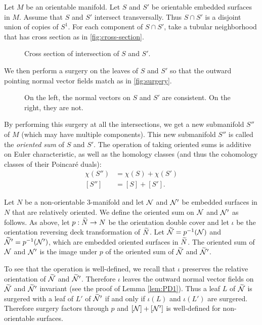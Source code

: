 Let $M$ be an orientable manifold.
Let $S$ and $S'$ be orientable embedded surfaces in $M$.
Assume that $S$ and $S'$ intersect transversally.
Thus $S \cap S'$ is a disjoint union of copies of $S^1$.
For each component of $S\cap S'$, take a tubular neighborhood that has cross section as in \autoref{fig:cross-section}.
\begin{figure}
  \centering
  \caption{Cross section of intersection of $S$ and $S'$.}
  \label{fig:cross-section}
\end{figure}



We then perform a surgery on the leaves of $S$ and $S'$ so that the outward pointing normal vector fields match as in \autoref{fig:surgery}.
\begin{figure}[b]
  \centering
  \caption{On the left, the normal vectors on $S$ and $S'$ are consistent. On the right, they are not.}
  \label{fig:surgery}
\end{figure}

By performing this surgery at all the intersections, we get a new submanifold $S''$ of $M$ (which may have multiple components).
This new submanifold $S''$ is called the {\it oriented sum} of $S$ and $S'$.
The operation of taking oriented sums is additive on Euler characteristic, as well as the homology classes (and thus the cohomology classes of their Poincar\'e duals):
\begin{align*}
  \chi(S'') &= \chi(S) + \chi(S') \\
  [S''] &= [S] + [S'].
\end{align*}

 Let $N$ be a non-orientable 3-manifold and let $\mathcal{N}$ and $\mathcal{N}'$ be embedded surfaces in $N$ that are relatively oriented.
We define the oriented sum on $\mathcal{N}$ and $\mathcal{N}'$ as follows.
As above, let $p:\widetilde{N}\rightarrow N$ be the orientation double cover and let $\iota$ be the orientation reversing deck transformation of $\widetilde{N}$.
Let $\widetilde{\mathcal{N}}=p^{-1}(\mathcal{N})$ and $\widetilde{\mathcal{N}}'=p^{-1}(\mathcal{N}')$, which are embedded oriented surfaces in $\widetilde{N}$.
The oriented sum of $\mathcal{N}$ and $\mathcal{N}'$ is the image under $p$ of the oriented sum of $\widetilde{\mathcal{N}}$ and $\widetilde{\mathcal{N}}'$. %

To see that the operation is well-defined, we recall that $\iota$ preserves the relative orientation of $\widetilde{\mathcal{N}}$ and $\widetilde{\mathcal{N}}'$.  Therefore $\iota$ leaves the outward normal vector fields on $\widetilde{\mathcal{N}}$ and $\widetilde{\mathcal{N}}'$ invariant (see the proof of Lemma \ref{lem:PD1}).
Thus a leaf $L$ of $\widetilde{\mathcal{N}}$ is surgered with a leaf of $L'$ of $\widetilde{\mathcal{N}}'$ if and only if $\iota(L)$ and $\iota(L')$ are surgered.
Therefore surgery factors through $p$ and $[\mathcal{N}]+[\mathcal{N}']$ is well-defined for non-orientable surfaces.

